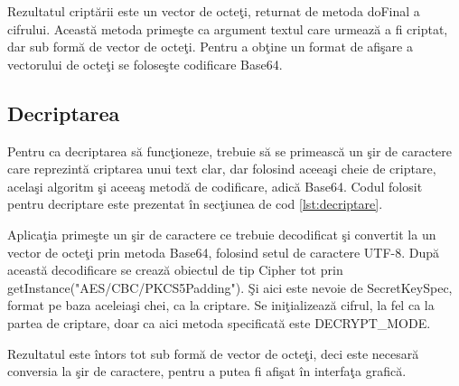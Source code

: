 Rezultatul cript\u{a}rii este un vector de octe\c{t}i, returnat de metoda doFinal a cifrului. Aceast\u{a} metoda prime\c{s}te ca argument textul care urmeaz\u{a} a fi criptat, dar sub form\u{a} de vector de octe\c{t}i. Pentru a ob\c{t}ine un format de afi\c{s}are a vectorului de octe\c{t}i se folose\c{s}te codificare Base64.

\subsection{Decriptarea}

Pentru ca decriptarea s\u{a} func\c{t}ioneze, trebuie s\u{a} se primeasc\u{a} un \c{s}ir de caractere care reprezint\u{a} criptarea unui text clar, dar folosind aceea\c{s}i cheie de criptare, acela\c{s}i algoritm \c{s}i aceea\c{s} metod\u{a} de codificare, adic\u{a} Base64. Codul folosit pentru decriptare este prezentat \^{i}n sec\c{t}iunea de cod \ref{lst:decriptare}.

\lstset{caption=Cod folosit pentru decriptare,
label=lst:decriptare}
 

Aplica\c{t}ia prime\c{s}te un \c{s}ir de caractere ce trebuie decodificat \c{s}i convertit la un vector de octe\c{t}i prin metoda Base64, folosind setul de caractere UTF-8. Dup\u{a} aceast\u{a} decodificare se creaz\u{a} obiectul de tip Cipher tot prin getInstance("AES/CBC/PKCS5Padding"). \c{S}i aici este nevoie de  SecretKeySpec, format pe baza aceleia\c{s}i chei, ca la criptare. Se ini\c{t}ializeaz\u{a} cifrul, la fel ca la partea de criptare, doar ca aici metoda specificat\u{a} este DECRYPT_MODE.

Rezultatul este \^{i}ntors tot sub form\u{a} de vector de octe\c{t}i, deci este necesar\u{a} conversia la \c{s}ir de caractere, pentru a putea fi afi\c{s}at \^{i}n interfa\c{t}a grafic\u{a}.

 